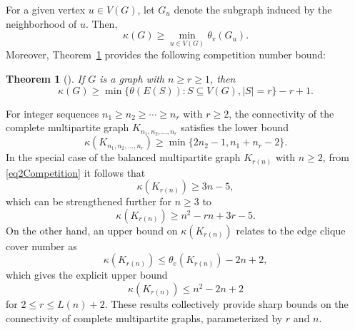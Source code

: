 \documentclass{article}
\newtheorem{theorem}{Theorem}[section]
\theoremstyle{definition}
\begin{document}
For a given vertex $u \in V(G)$, let $G_u$ denote the subgraph induced by the neighborhood of $u$. Then,
\[
\kappa(G) \geq \min_{u \in V(G)} \theta_v(G_u).
\]
Moreover, Theorem~\ref{thm3Competition} provides the following competition number bound:

\begin{theorem}[{\cite{BJGJChangCAS}}]\label{thm3Competition}
If $G$ is a graph with $n \geq r \geq 1$, then
\[
\kappa(G) \geq \min\{\theta(E(S)) : S \subseteq V(G), |S| = r\} - r + 1.
\]
\end{theorem}

For integer sequences $n_1 \geq n_2 \geq \cdots \geq n_r$ with $r \geq 2$, the connectivity of the complete multipartite graph $K_{n_1, n_2, \ldots, n_r}$ satisfies the lower bound
\begin{equation}\label{eq2Competition}
\kappa(K_{n_1, n_2, \ldots, n_r}) \geq \min\{2 n_2 - 1, n_1 + n_r - 2\}.
\end{equation}
In the special case of the balanced multipartite graph $K_{r(n)}$ with $n \geq 2$, from \eqref{eq2Competition} it follows that
\[
\kappa(K_{r(n)}) \geq 3n - 5,
\]
which can be strengthened further for $n \geq 3$ to
\[
\kappa(K_{r(n)}) \geq n^2 - r n + 3 r - 5.
\]
On the other hand, an upper bound on $\kappa(K_{r(n)})$ relates to the edge clique cover number as
\[
\kappa(K_{r(n)}) \leq \theta_e(K_{r(n)}) - 2 n + 2,
\]
which gives the explicit upper bound
\[
\kappa(K_{r(n)}) \leq n^2 - 2 n + 2
\]
for $2 \leq r \leq L(n) + 2$. These results collectively provide sharp bounds on the connectivity of complete multipartite graphs, parameterized by $r$ and $n$.


\end{document}
